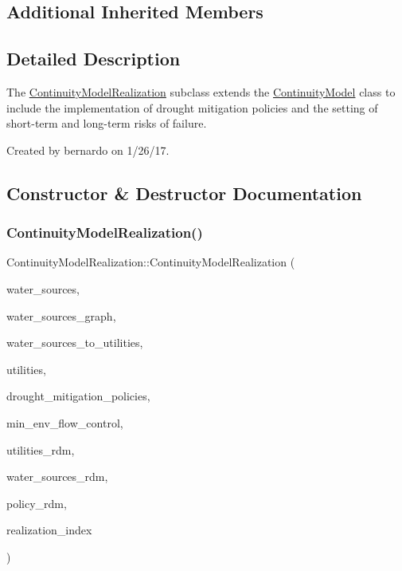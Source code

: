 \subsection*{Additional Inherited Members}


\subsection{Detailed Description}
The {\ttfamily \mbox{\hyperlink{classContinuityModelRealization}{Continuity\+Model\+Realization}}} subclass extends the {\ttfamily \mbox{\hyperlink{classContinuityModel}{Continuity\+Model}}} class to include the implementation of drought mitigation policies and the setting of short-\/term and long-\/term risks of failure. 

Created by bernardo on 1/26/17. 

\subsection{Constructor \& Destructor Documentation}
\mbox{\label{classContinuityModelRealization_a641c096ac73586597b3e21a5d516c923}} 
\subsubsection{\texorpdfstring{Continuity\+Model\+Realization()}{ContinuityModelRealization()}}
{\footnotesize\ttfamily Continuity\+Model\+Realization\+::\+Continuity\+Model\+Realization (\begin{DoxyParamCaption}\item[{vector$<$ \mbox{\hyperlink{classWaterSource}{Water\+Source}} $\ast$$>$ \&}]{water\+\_\+sources,  }\item[{const \mbox{\hyperlink{classGraph}{Graph}} \&}]{water\+\_\+sources\+\_\+graph,  }\item[{const vector$<$ vector$<$ int $>$$>$ \&}]{water\+\_\+sources\+\_\+to\+\_\+utilities,  }\item[{vector$<$ \mbox{\hyperlink{classUtility}{Utility}} $\ast$$>$ \&}]{utilities,  }\item[{const vector$<$ \mbox{\hyperlink{classDroughtMitigationPolicy}{Drought\+Mitigation\+Policy}} $\ast$$>$ \&}]{drought\+\_\+mitigation\+\_\+policies,  }\item[{vector$<$ \mbox{\hyperlink{classMinEnvFlowControl}{Min\+Env\+Flow\+Control}} $\ast$$>$ \&}]{min\+\_\+env\+\_\+flow\+\_\+control,  }\item[{vector$<$ double $>$ \&}]{utilities\+\_\+rdm,  }\item[{vector$<$ double $>$ \&}]{water\+\_\+sources\+\_\+rdm,  }\item[{vector$<$ double $>$ \&}]{policy\+\_\+rdm,  }\item[{const unsigned int}]{realization\+\_\+index }\end{DoxyParamCaption})}



